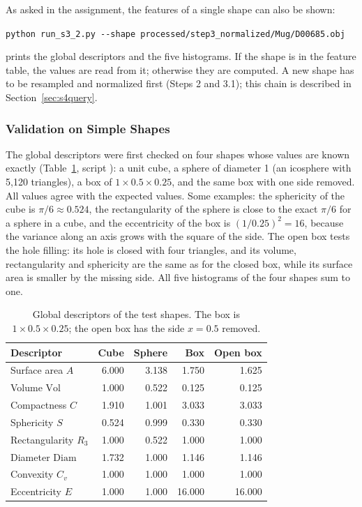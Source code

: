 \documentclass[10pt,a4paper]{article}
\begin{document}
As asked in the assignment, the features of a single shape can also be shown:
\begin{center}
\texttt{python run\_s3\_2.py -{}-shape processed/step3\_normalized/Mug/D00685.obj}
\end{center}
prints the global descriptors and the five histograms. If the shape is in the feature table, the values are read from it;
otherwise they are computed. A new shape has to be resampled and normalized first (Steps 2 and 3.1); this chain is described in
Section~\ref{sec:s4query}.

\subsubsection{Validation on Simple Shapes}

The global descriptors were first checked on four shapes whose values are known exactly (Table~\ref{tab:s32_validation},
script ): a unit cube, a sphere of diameter 1 (an icosphere with 5,120 triangles), a box of
$1\times0.5\times0.25$, and the same box with one side removed. All values agree with the expected values. Some examples:
the sphericity of the cube is $\pi/6\approx0.524$, the rectangularity of the sphere is close to the exact $\pi/6$ for a sphere in a
cube, and the eccentricity of the box is $(1/0.25)^2=16$, because the variance along an axis grows with the square of the side.
The open box tests the hole filling: its hole is closed with four triangles, and its volume, rectangularity and sphericity are the
same as for the closed box, while its surface area is smaller by the missing side. All five histograms of the four shapes sum to
one.

\begin{table}[htbp]\centering\small
\begin{tabular}{@{}lrrrr@{}}\toprule
Descriptor & Cube & Sphere & Box & Open box\\\midrule
Surface area $A$ & 6.000 & 3.138 & 1.750 & 1.625\\
Volume $\mathrm{Vol}$ & 1.000 & 0.522 & 0.125 & 0.125\\
Compactness $C$ & 1.910 & 1.001 & 3.033 & 3.033\\
Sphericity $S$ & 0.524 & 0.999 & 0.330 & 0.330\\
Rectangularity $R_3$ & 1.000 & 0.522 & 1.000 & 1.000\\
Diameter $\mathrm{Diam}$ & 1.732 & 1.000 & 1.146 & 1.146\\
Convexity $C_v$ & 1.000 & 1.000 & 1.000 & 1.000\\
Eccentricity $E$ & 1.000 & 1.000 & 16.000 & 16.000\\
\bottomrule\end{tabular}
\caption{Global descriptors of the test shapes. The box is $1\times0.5\times0.25$; the open box has the side $x=0.5$ removed.}
\label{tab:s32_validation}
\end{table}
\end{document}
